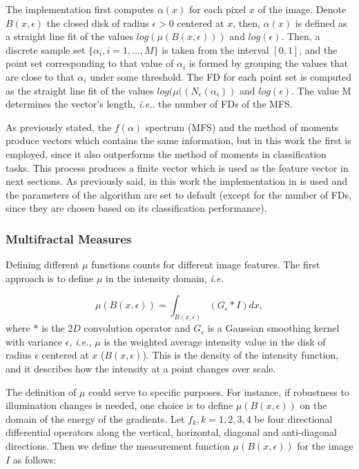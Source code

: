 The implementation first computes $\alpha(x)$ for each pixel $x$ of the image. Denote $B(x,\epsilon)$ the closed disk of radius $\epsilon > 0$ centered at $x$, then, $\alpha(x)$ is defined as a straight line fit of the values $log(\mu(B(x,\epsilon)))$ and $log(\epsilon)$. Then, a discrete sample set $\{\alpha_{i}, i = 1,\dots,M\}$ is taken from the interval $[0,1]$, and the point set corresponding to that value of $\alpha_{i}$ is formed by grouping the values that are close to that $\alpha_{i}$ under some threshold. The FD for each point set is computed as the straight line fit of the values $log(\mu((N_{\epsilon}(\alpha_{i}))$ and $log(\epsilon)$. The value M determines the vector's length, {\em i.e.}. the number of FDs of the MFS.


As previously stated, the $f(\alpha)$ spectrum (MFS) and the method of moments produce vectors which contains the same information, but in this work the first is employed, since it also outperforms the method of moments in classification tasks. This process produces a finite vector which is used as the feature vector in next sections. As previously said, in this work the implementation in \cite{Xu2009} is used and the parameters of the algorithm are set to default (except for the number of FDs, since they are chosen based on its classification performance).


\subsubsection{Multifractal Measures}
Defining different $\mu$ functions counts for different image features. The first approach is to define $\mu$ in the intensity domain, {\em i.e.}

\begin{equation}
\mu(B(x,\epsilon)) = \int_{B(x,\epsilon)}{(G_{\epsilon} \ast I)} dx,
\label{eqn:eqn11}
\end{equation}
where $\ast$ is the $2D$ convolution operator and $G_{\epsilon}$ is a Gaussian smoothing kernel with variance $\epsilon$, {\em i.e., } $\mu$ is the weighted average intensity value in the disk of radius $\epsilon$ centered at $x$ ($B(x,\epsilon)$). This is the density of the intensity function, and it describes how the intensity at a point changes over scale.

The definition of $\mu$ could serve to specific purposes. For instance, if robustness to illumination changes is needed, one choice is to define $\mu(B(x,\epsilon))$ on the domain of the energy of the gradients. Let ${ f_{k} , k = 1, 2, 3, 4}$ be four directional differential operators along the vertical, horizontal, diagonal and anti-diagonal directions. Then we define the measurement function $\mu(B(x,\epsilon))$ for the image $I$ as follows:

